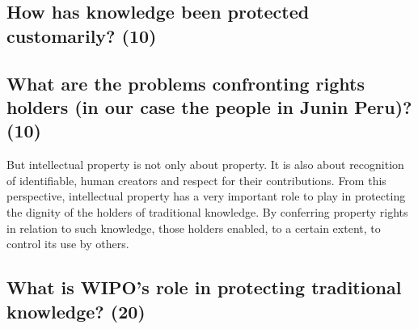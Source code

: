 \documentclass[11pt]{article}
\begin{document}
\subsection{How has knowledge been protected customarily? (10)}
\label{sec:org485676c}


\subsection{What are the problems confronting rights holders (in our case the people in Junin Peru)? (10)}
\label{sec:org0767d66}
But intellectual property is not only about property. It is also
about recognition of identifiable, human creators and respect
for their contributions. From this perspective, intellectual
property has a very important role to play in protecting the
dignity of the holders of traditional knowledge. By conferring
property rights in relation to such knowledge, those holders
enabled, to a certain extent, to control its use by others.


\subsection{What is WIPO's role in protecting traditional knowledge? (20)}
\label{sec:org5d9cd52}

\printbibliography
\end{document}
